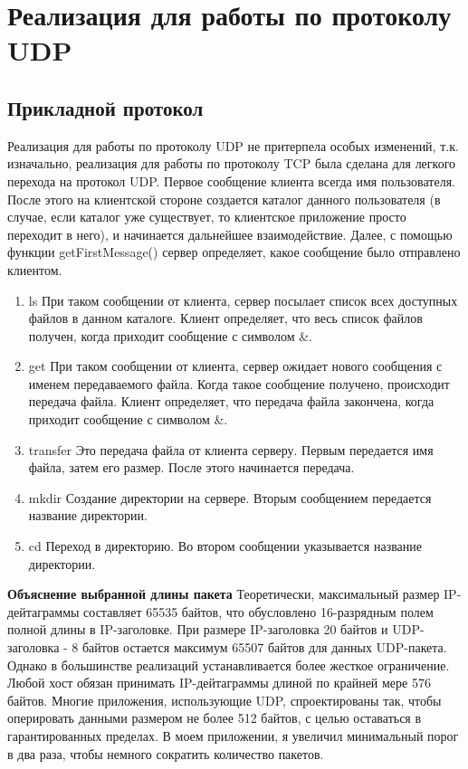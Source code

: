 \documentclass[12pt,a4paper]{report}
\begin{document}
\chapter{Реализация для работы по протоколу UDP}
\section{Прикладной протокол}
Реализация для работы по протоколу UDP не притерпела особых изменений, т.к. изначально, реализация для работы по протоколу TCP была сделана для легкого перехода на протокол UDP.
Первое сообщение клиента всегда имя пользователя. После этого на клиентской стороне создается каталог данного пользователя (в случае, если каталог уже существует, то клиентское приложение просто переходит в него), и начинается дальнейшее взаимодействие.
Далее, с помощью функции getFirstMessage() сервер определяет, какое сообщение было отправлено клиентом. 
\begin{enumerate}
\item{ls}
При таком сообщении от клиента, сервер посылает список всех доступных файлов в данном каталоге. Клиент определяет, что весь список файлов получен, когда приходит сообщение с символом \&.
\item{get}
При таком сообщении от клиента, сервер ожидает нового сообщения с именем передаваемого файла. Когда такое сообщение получено, происходит передача файла. Клиент определяет, что передача файла закончена, когда приходит сообщение с символом \&.
\item{transfer}
Это передача файла от клиента серверу. Первым передается имя файла, затем его размер. После этого начинается передача.
\item{mkdir}
Создание директории на сервере. Вторым сообщением передается название директории.
\item{cd}
Переход в директорию. Во втором сообщении указывается название директории.
\end{enumerate}
\textbf{Объяснение выбранной длины пакета}\newline
	Теоретически, максимальный размер IP-дейтаграммы составляет 65535 байтов, что обусловлено 16-разрядным полем полной длины в IP-заголовке. При размере IP-заголовка 20 байтов и UDP-заголовка - 8 байтов остается максимум 65507 байтов для данных UDP-пакета. Однако в большинстве реализаций устанавливается более жесткое ограничение.
\newline
	Любой хост обязан принимать IP-дейтаграммы длиной по крайней мере 576 байтов. Многие приложения, использующие UDP, спроектированы так, чтобы оперировать данными размером не более 512 байтов, с целью оставаться в гарантированных пределах.
\newline
	В моем приложении, я увеличил минимальный порог в два раза, чтобы немного сократить количество пакетов.
\end{document}
